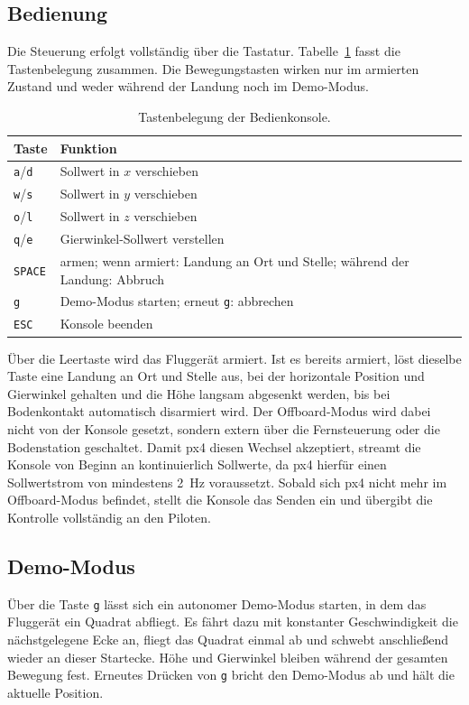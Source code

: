 \subsection*{Bedienung}
Die Steuerung erfolgt vollständig über die Tastatur.
Tabelle~\ref{tab:konsole_tasten} fasst die Tastenbelegung zusammen.
Die Bewegungstasten wirken nur im armierten Zustand und weder während der Landung noch im Demo-Modus.

\begin{table}[htbp]
\centering
\caption{Tastenbelegung der Bedienkonsole.}
\label{tab:konsole_tasten}
\begin{tabular}{ll}
\toprule
Taste & Funktion \\
\midrule
\texttt{a}/\texttt{d} & Sollwert in $x$ verschieben \\
\texttt{w}/\texttt{s} & Sollwert in $y$ verschieben \\
\texttt{o}/\texttt{l} & Sollwert in $z$ verschieben \\
\texttt{q}/\texttt{e} & Gierwinkel-Sollwert verstellen \\
\texttt{SPACE} & armen; wenn armiert: Landung an Ort und Stelle; während der Landung: Abbruch \\
\texttt{g} & Demo-Modus starten; erneut \texttt{g}: abbrechen \\
\texttt{ESC} & Konsole beenden \\
\bottomrule
\end{tabular}
\end{table}

Über die Leertaste wird das Fluggerät armiert.
Ist es bereits armiert, löst dieselbe Taste eine Landung an Ort und Stelle aus, bei der horizontale Position und Gierwinkel gehalten und die Höhe langsam abgesenkt werden, bis bei Bodenkontakt automatisch disarmiert wird.
Der Offboard-Modus wird dabei nicht von der Konsole gesetzt, sondern extern über die Fernsteuerung oder die Bodenstation geschaltet.
Damit \gls{px4} diesen Wechsel akzeptiert, streamt die Konsole von Beginn an kontinuierlich Sollwerte, da \gls{px4} hierfür einen Sollwertstrom von mindestens \SI{2}{\hertz} voraussetzt.
Sobald sich \gls{px4} nicht mehr im Offboard-Modus befindet, stellt die Konsole das Senden ein und übergibt die Kontrolle vollständig an den Piloten.

\subsection*{Demo-Modus}
Über die Taste \texttt{g} lässt sich ein autonomer Demo-Modus starten, in dem das Fluggerät ein Quadrat abfliegt.
Es fährt dazu mit konstanter Geschwindigkeit die nächstgelegene Ecke an, fliegt das Quadrat einmal ab und schwebt anschließend wieder an dieser Startecke.
Höhe und Gierwinkel bleiben während der gesamten Bewegung fest.
Erneutes Drücken von \texttt{g} bricht den Demo-Modus ab und hält die aktuelle Position.

